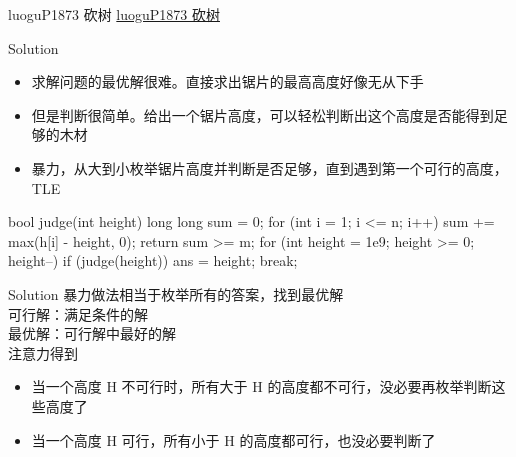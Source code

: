 \documentclass[aspectratio=169,xcolor=dvipsnames]{beamer}
\begin{document}
\begin{frame}{luoguP1873 砍树}
    \href{https://www.luogu.com.cn/problem/P1873}{luoguP1873 砍树}
\end{frame}

\begin{frame}[fragile]{Solution}
    \begin{itemize}
        \item 求解问题的最优解很难。直接求出锯片的最高高度好像无从下手
        \item 但是判断很简单。给出一个锯片高度，可以轻松判断出这个高度是否能得到足够的木材
        \item 暴力，从大到小枚举锯片高度并判断是否足够，直到遇到第一个可行的高度，TLE
    \end{itemize}

    \begin{cppcode}
    bool judge(int height) {
        long long sum = 0;
        for (int i = 1; i <= n; i++)
            sum += max(h[i] - height, 0);
        return sum >= m;
    }
    for (int height = 1e9; height >= 0; height--) {
        if (judge(height)) {
            ans = height;
            break;
        }
    }
    \end{cppcode}
\end{frame}

\begin{frame}[fragile]{Solution}
    暴力做法相当于枚举所有的答案，找到最优解\\
    可行解：满足条件的解\\
    最优解：可行解中最好的解\\
    注意力得到
    \begin{itemize}
        \item 当一个高度 H 不可行时，所有大于 H 的高度都不可行，没必要再枚举判断这些高度了
        \item 当一个高度 H 可行，所有小于 H 的高度都可行，也没必要判断了
    \end{itemize}
\end{frame}
\end{document}
